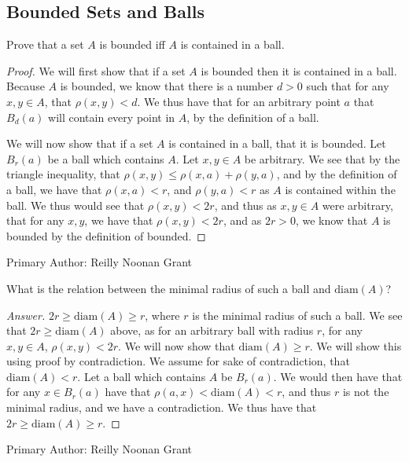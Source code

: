 \subsection{Bounded Sets and Balls}

\begin{majorEx}%
    Prove that a set $A$ is bounded iff $A$ is contained in a ball.
\end{majorEx}

\begin{proof}
  We will first show that if a set $A$ is bounded then it is contained
  in a ball. Because $A$ is bounded, we know that there is a number
  $d>0$ such that for any $x,y \in A$, that $\rho(x,y)<d$. We thus
  have that for an arbitrary point $a$ that $B_d(a)$ will contain
  every point in $A$, by the definition of a ball.

  We will now show that if a set $A$ is contained in a ball, that it
  is bounded. Let $B_r(a)$ be a ball which contains $A$. Let $x,y\in
  A$ be arbitrary. We see that by the triangle inequality, that 
  $\rho(x,y)\leq \rho(x,a) + \rho(y,a)$, and by the definition of a
  ball, we have that $\rho(x,a)<r$, and  $\rho(y,a)<r$ as $A$ is
  contained within the ball. We thus would see that  $\rho(x,y)< 2r$,
  and thus as $x,y\in A$ were arbitrary, that  for any $x,y$, we have
  that $\rho(x,y)< 2r$, and as $2r>0$, we know that $A$ is bounded by
  the definition of bounded.
\end{proof}
Primary Author: Reilly Noonan Grant

\begin{minorEx}%
    What is the relation between the minimal radius of such a ball and
    $\mathrm{diam}(A)$?
\end{minorEx}

\begin{proof}[Answer]
  $2r\geq \mathrm{diam}(A) \geq r$, where $r$ is the minimal radius of such a
  ball. We see that $2r\geq \mathrm{diam}(A)$ above, as for an
  arbitrary ball with radius $r$, for any $x,y\in A$,
  $\rho(x,y)<2r$. We will now show that $\mathrm{diam}(A) \geq r$.
  We will show this using proof by contradiction. We assume for
  sake of contradiction, that  $\mathrm{diam}(A) < r$. Let a ball
  which contains $A$ be $B_r(a)$. We would then have that for any $x\in B_r(a)$
  have that $\rho(a,x)<\mathrm{diam}(A)<r$, and thus $r$ is not the
  minimal radius, and we have a contradiction. 
  We thus have that $2r\geq \mathrm{diam}(A) \geq r$.
\end{proof}
Primary Author: Reilly Noonan Grant
